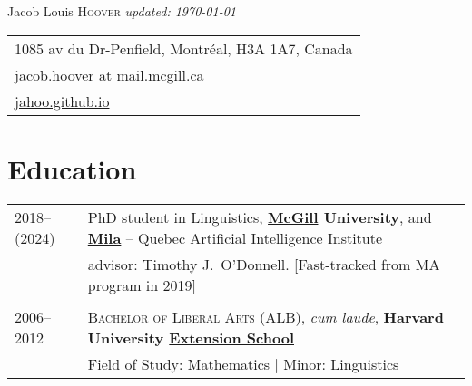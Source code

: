 \documentclass[11pt,a4paper]{article}
\begin{document}
\pagestyle{empty}
\Huge{Jacob Louis \scshape{Hoover}}
\small\textit{\hfill updated: \today}

\begin{tabular}{l}
  1085 av du Dr-Penfield, Montréal, H3A 1A7, Canada \\
  jacob.hoover at mail.mcgill.ca\\
  \href{http://jahoo.github.io}{jahoo.github.io}
\end{tabular}
\vspace*{10pt}

\section{Education}

\begin{longtable}{p{2cm}|p{14.5cm}}
  2018--(2024)%
    &%
    PhD student in Linguistics,
    \textbf{\href{https://www.mcgill.ca/linguistics/graduate}{McGill} University}, and
    \href{http://mila.quebec}{\textbf{Mila}} -- Quebec Artificial Intelligence
    Institute \\
    &%
    advisor: Timothy J.\ O'Donnell. [Fast-tracked from MA program in 2019] \\
    \multicolumn{2}{c}{}\\
  2006--2012%
    &%
    \textsc{Bachelor of Liberal Arts (ALB)}, \emph{cum laude},%
    \textbf{Harvard University \href{https://extension.harvard.edu/}{Extension School}}\\
    &%
    Field of Study: Mathematics | Minor: Linguistics\\
  \end{longtable}
\end{document}
